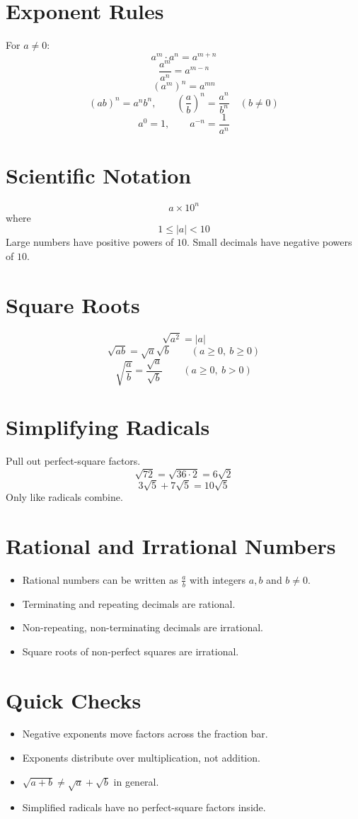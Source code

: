 \documentclass[11pt]{article}
\begin{document}

\section*{Exponent Rules}
For $a\ne0$:
\[
a^m\cdot a^n=a^{m+n}
\]
\[
\frac{a^m}{a^n}=a^{m-n}
\]
\[
(a^m)^n=a^{mn}
\]
\[
(ab)^n=a^nb^n,\qquad \left(\frac{a}{b}\right)^n=\frac{a^n}{b^n}\quad (b\ne0)
\]
\[
a^0=1,\qquad a^{-n}=\frac{1}{a^n}
\]

\section*{Scientific Notation}
\[
a\times 10^n
\]
where
\[
1\le |a|<10
\]
Large numbers have positive powers of $10$. Small decimals have negative powers of $10$.

\section*{Square Roots}
\[
\sqrt{a^2}=|a|
\]
\[
\sqrt{ab}=\sqrt a\sqrt b\qquad (a\ge0,\ b\ge0)
\]
\[
\sqrt{\frac{a}{b}}=\frac{\sqrt a}{\sqrt b}\qquad (a\ge0,\ b>0)
\]

\section*{Simplifying Radicals}
Pull out perfect-square factors.
\[
\sqrt{72}=\sqrt{36\cdot2}=6\sqrt2
\]
\[
3\sqrt5+7\sqrt5=10\sqrt5
\]
Only like radicals combine.

\section*{Rational and Irrational Numbers}
\begin{itemize}
  \item Rational numbers can be written as $\frac{a}{b}$ with integers $a,b$ and $b\ne0$.
  \item Terminating and repeating decimals are rational.
  \item Non-repeating, non-terminating decimals are irrational.
  \item Square roots of non-perfect squares are irrational.
\end{itemize}

\section*{Quick Checks}
\begin{itemize}
  \item Negative exponents move factors across the fraction bar.
  \item Exponents distribute over multiplication, not addition.
  \item $\sqrt{a+b}\ne \sqrt a+\sqrt b$ in general.
  \item Simplified radicals have no perfect-square factors inside.
\end{itemize}
\end{document}
